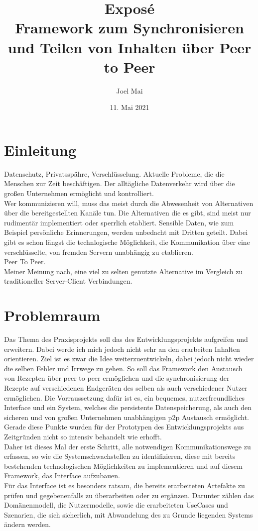 \documentclass[10pt]{article}
\author{Joel Mai}
\title{Exposé\\ Framework zum Synchronisieren und Teilen von Inhalten über Peer to Peer}
\date{11. Mai 2021}
\begin{document}
    \maketitle 

    \newpage

    \section{Einleitung}\label{sec:Einleitung}
    Datenschutz, Privatsspähre, Verschlüsselung. Aktuelle Probleme, die die Menschen zur Zeit beschäftigen. Der alltägliche Datenverkehr wird über die großen Unternehmen ermöglicht und kontrolliert\cite{waandfb2021}. \\ 
    Wer kommunizieren will, muss das meist durch die Abwesenheit von Alternativen über die bereitgestellten Kanäle tun. Die Alternativen die es gibt, sind meist nur rudimentär implementiert oder sperrlich etabliert.
    Sensible Daten, wie zum Beispiel persönliche Erinnerungen, werden unbedacht mit Dritten geteilt. Dabei gibt es schon längst die technlogische Möglichkeit, die Kommunikation über eine verschlüsselte, von fremden Servern unabhängig zu etablieren.\\ Peer To Peer.\\ Meiner Meinung nach, eine viel zu selten genutzte Alternative im Vergleich zu traditioneller Server-Client Verbindungen.

    \section{Problemraum}\label{sec:Problemraum}
    Das Thema des Praxisprojekts soll das des Entwicklungsprojekts\cite{cobanmai2021} aufgreifen und erweitern. Dabei werde ich mich jedoch nicht sehr an den erarbeiten Inhalten orientieren. Ziel ist es zwar die Idee weiterzuentwickeln, dabei jedoch nicht wieder die selben Fehler und Irrwege zu gehen. So soll das Framework den Austausch von Rezepten über peer to peer ermöglichen und die synchronisierung der Rezepte auf verschiedenen Endgeräten des selben als auch verschiedener Nutzer ermöglichen. Die Vorraussetzung dafür ist es, ein bequemes, nutzerfreundliches Interface und ein System, welches die persistente Datenspeicherung, als auch den sicheren und von großen Unternehmen unabhängigen p2p Austausch ermöglicht. \\
    Gerade diese Punkte wurden für der Prototypen des Entwicklungsprojekts aus Zeitgründen nicht so intensiv behandelt wie erhofft. \\
    Daher ist dieses Mal der erste Schritt, alle notwendigen Kommunikationswege zu erfassen, so wie die Systemschwachstellen zu identifizieren, diese mit bereits bestehenden technologischen Möglichkeiten zu implementieren und auf diesem Framework, das Interface aufzubauen. \\
    Für das Interface ist es besonders ratsam, die bereits erarbeiteten Artefakte zu prüfen und gegebenenfalls zu überarbeiten oder zu ergänzen. Darunter zählen das Domänenmodell, die Nutzermodelle, sowie die erarbeiteten UseCases und Szenarien, die sich sicherlich, mit Abwandelung des zu Grunde liegenden Systems ändern werden. \\
\end{document}
